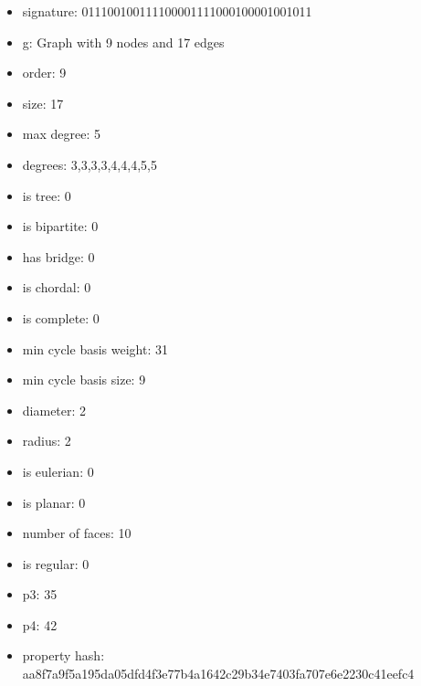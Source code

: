 \newpage
\begin{figure}
\end{figure}
\begin{itemize}
\item signature: 011100100111100001111000100001001011
\item g: Graph with 9 nodes and 17 edges
\item order: 9
\item size: 17
\item max degree: 5
\item degrees: 3,3,3,3,4,4,4,5,5
\item is tree: 0
\item is bipartite: 0
\item has bridge: 0
\item is chordal: 0
\item is complete: 0
\item min cycle basis weight: 31
\item min cycle basis size: 9
\item diameter: 2
\item radius: 2
\item is eulerian: 0
\item is planar: 0
\item number of faces: 10
\item is regular: 0
\item p3: 35
\item p4: 42
\item property hash: aa8f7a9f5a195da05dfd4f3e77b4a1642c29b34e7403fa707e6e2230c41eefc4
\end{itemize}
